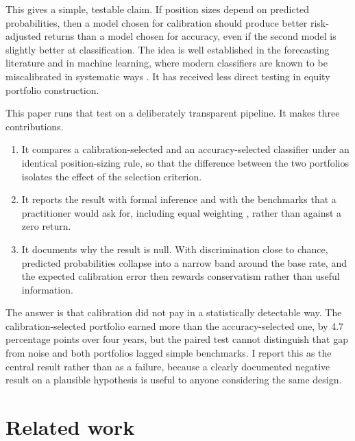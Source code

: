 \documentclass[11pt,a4paper]{article}
\begin{document}
This gives a simple, testable claim. If position sizes depend on predicted probabilities, then a model chosen for calibration should produce better risk-adjusted returns than a model chosen for accuracy, even if the second model is slightly better at classification. The idea is well established in the forecasting literature \citep{brier1950,murphy1973} and in machine learning, where modern classifiers are known to be miscalibrated in systematic ways \citep{niculescu2005,guo2017}. It has received less direct testing in equity portfolio construction.

This paper runs that test on a deliberately transparent pipeline. It makes three contributions.
\begin{enumerate}
  \item It compares a calibration-selected and an accuracy-selected classifier under an identical position-sizing rule, so that the difference between the two portfolios isolates the effect of the selection criterion.
  \item It reports the result with formal inference and with the benchmarks that a practitioner would ask for, including equal weighting \citep{demiguel2009}, rather than against a zero return.
  \item It documents why the result is null. With discrimination close to chance, predicted probabilities collapse into a narrow band around the base rate, and the expected calibration error then rewards conservatism rather than useful information.
\end{enumerate}

The answer is that calibration did not pay in a statistically detectable way. The calibration-selected portfolio earned more than the accuracy-selected one, by 4.7 percentage points over four years, but the paired test cannot distinguish that gap from noise and both portfolios lagged simple benchmarks. I report this as the central result rather than as a failure, because a clearly documented negative result on a plausible hypothesis is useful to anyone considering the same design.

\section{Related work}
\end{document}
